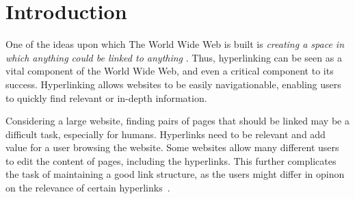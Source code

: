 \chapter{Introduction}
One of the ideas upon which The World Wide Web is built is \emph{creating a space in which anything could be linked to anything} \cite[ch.~1, p.~4]{Weaving-the-web}. Thus, hyperlinking can be seen as a vital component of the World Wide Web, and even a critical component to its success. Hyperlinking allows websites to be easily navigationable, enabling users to quickly find relevant or in-depth information.





Considering a large website, finding pairs of pages that should be linked may be a difficult task, especially for humans. Hyperlinks need to be relevant and add value for a user browsing the website. Some websites allow many different users to edit the content of pages, including the hyperlinks. This further complicates the task of maintaining a good link structure, as the users might differ in opinon on the relevance of certain hyperlinks~\cite{ellis1994measurement}. 

